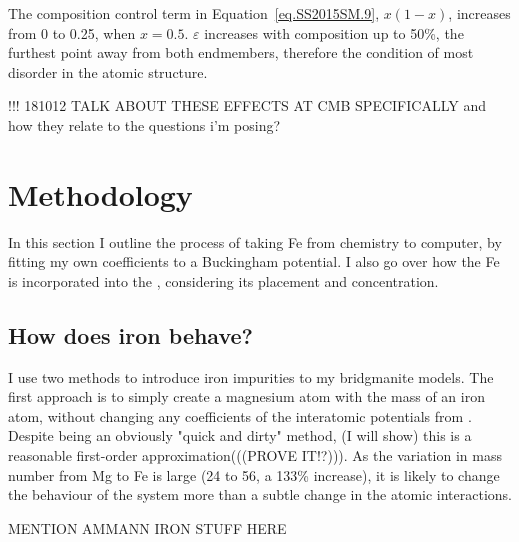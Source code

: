 The composition control term in Equation~\ref{eq.SS2015SM.9}, $x(1-x)$, increases from 0 to 0.25, when $x = 0.5$. $\varepsilon$ increases with composition up to 50\%, the furthest point away from both endmembers, therefore the condition of most disorder in the atomic structure.

!!! 181012 TALK ABOUT THESE EFFECTS AT CMB SPECIFICALLY and how they relate to the questions i'm posing?



\section{Methodology}

In this section I outline the process of taking Fe from chemistry to computer, by fitting my own coefficients to a Buckingham potential. I also go over how the Fe is incorporated into the \mgsio, considering its placement and concentration.

\subsection{How does iron behave?} 

I use two methods to introduce iron impurities to my bridgmanite models. The first approach is to simply create a magnesium atom with the mass of an iron atom, without changing any coefficients of the interatomic potentials from \citet{Oganov2000}. Despite being an obviously "quick and dirty" method, (I will show) this is a reasonable first-order approximation(((PROVE IT!?))). As the variation in mass number from Mg to Fe is large (24 to 56, a 133\% increase), it is likely to change the behaviour of the system more than a subtle change in the atomic interactions.

MENTION AMMANN IRON STUFF HERE

